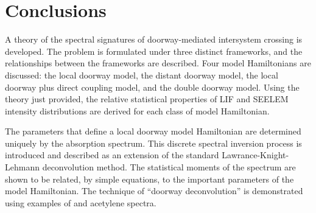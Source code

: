 \chapter{Conclusions}









A theory of the spectral signatures of doorway-mediated intersystem
crossing is developed.  The problem is formulated under three distinct
frameworks, and the relationships between the frameworks are
described.  Four model Hamiltonians are discussed: the local doorway
model, the distant doorway model, the local doorway plus direct
coupling model, and the double doorway model.  Using the theory just
provided, the relative statistical properties of LIF and SEELEM
intensity distributions are derived for each class of model
Hamiltonian.














The parameters that define a local doorway model Hamiltonian are
determined uniquely by the absorption spectrum.  This discrete
spectral inversion process is introduced and described as an extension
of the standard Lawrance-Knight-Lehmann deconvolution method.  The
statistical moments of the spectrum are shown to be related, by simple
equations, to the important parameters of the model Hamiltonian.  The
technique of ``doorway deconvolution'' is demonstrated using examples
of  and acetylene spectra.

